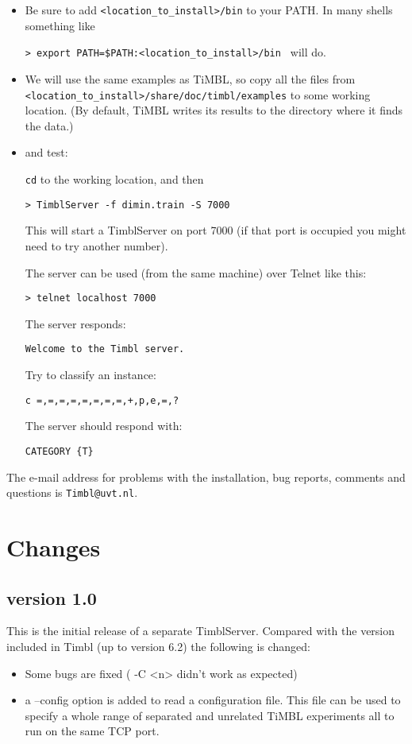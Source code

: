 \documentclass{report}
\begin{document}
\begin{itemize}
\item Be sure to add {\tt <location\_to\_install>/bin} to your PATH. 
In many shells something like

 {\tt > export PATH=\$PATH:<location\_to\_install>/bin }
will do.
\item We will use the same examples as TiMBL, so copy all the files from {\tt
  <location\_to\_install>/share/doc/timbl/examples} to some working
location. (By default, TiMBL writes its results to the directory where
it finds the data.)
\item and test:

{\tt cd} to the working location, and then

{\tt > TimblServer -f dimin.train -S 7000}

This will start a TimblServer on port 7000 (if that port is occupied you might need to try another number).

The server can be used (from the same machine) over Telnet like this:

{\tt > telnet localhost 7000 }

The server responds:

{\tt Welcome to the Timbl server.}

Try to classify an instance:

{\tt c =,=,=,=,=,=,=,=,+,p,e,=,? }

The server should respond with:

{\tt CATEGORY \{T\} }

\end{itemize}

The e-mail address for problems with the installation, bug reports, comments and questions is {\tt Timbl@uvt.nl}.

\chapter{Changes}
\label{changes}

\section{version 1.0}

This is the initial release of a separate TimblServer.
Compared with the version included in Timbl (up to version 6.2) the following is changed:

\begin{itemize}

\item Some bugs are fixed ( -C <n> didn't work as expected)
\item a --config option is added to read a configuration file. This
  file can be used to specify a whole range of separated and unrelated
  TiMBL experiments all to run on the same TCP port.

\end{itemize}
\end{document}
